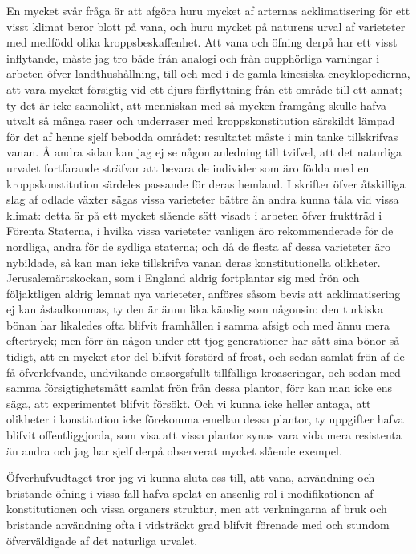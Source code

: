En mycket svår fråga är att afgöra huru mycket af arternas acklimatisering för ett visst klimat beror blott på vana, och huru mycket på naturens urval af varieteter med medfödd olika kroppsbeskaffenhet. Att vana och öfning derpå har ett visst inflytande, måste jag tro både från analogi och från oupphörliga varningar i arbeten öfver landthushållning, till och med i de gamla kinesiska encyklopedierna, att vara mycket försigtig vid ett djurs förflyttning från ett område till ett annat; ty det är icke sannolikt, att menniskan med så mycken framgång skulle hafva utvalt så många raser och underraser med kroppskonstitution särskildt lämpad för det af henne sjelf bebodda området: resultatet måste i min tanke tillskrifvas vanan. Å andra sidan kan jag ej se någon anledning till tvifvel, att det naturliga urvalet fortfarande sträfvar att bevara de individer som äro födda med en kroppskonstitution särdeles passande för deras hemland. I skrifter öfver åtskilliga slag af odlade växter sägas vissa varieteter bättre än andra kunna tåla vid vissa klimat: detta är på ett mycket slående sätt visadt i arbeten öfver fruktträd i Förenta Staterna, i hvilka vissa varieteter vanligen äro rekommenderade för de nordliga, andra för de sydliga staterna; och då de flesta af dessa varieteter äro nybildade, så kan man icke tillskrifva vanan deras konstitutionella olikheter. Jerusalemärtskockan, som i England aldrig fortplantar sig med frön och följaktligen aldrig lemnat nya varieteter, anföres såsom bevis att acklimatisering ej kan åstadkommas, ty den är ännu lika känslig som någonsin: den turkiska bönan har likaledes ofta blifvit framhållen i samma afsigt och med ännu mera eftertryck; men förr än någon under ett tjog generationer har sått sina bönor så tidigt, att en mycket stor del blifvit förstörd af frost, och sedan samlat frön af de få öfverlefvande, undvikande omsorgsfullt tillfälliga kroaseringar, och sedan med samma försigtighetsmått samlat frön från dessa plantor, förr kan man icke ens säga, att experimentet blifvit försökt. Och vi kunna icke heller antaga, att olikheter i konstitution icke förekomma emellan dessa plantor, ty uppgifter hafva blifvit offentliggjorda, som visa att vissa plantor synas vara vida mera resistenta än andra och jag har sjelf derpå observerat mycket slående exempel.

Öfverhufvudtaget tror jag vi kunna sluta oss till, att vana, användning och bristande öfning i vissa fall hafva spelat en ansenlig rol i modifikationen af konstitutionen och vissa organers struktur, men att verkningarna af bruk och bristande användning ofta i vidsträckt grad blifvit förenade med och stundom öfverväldigade af det naturliga urvalet.



